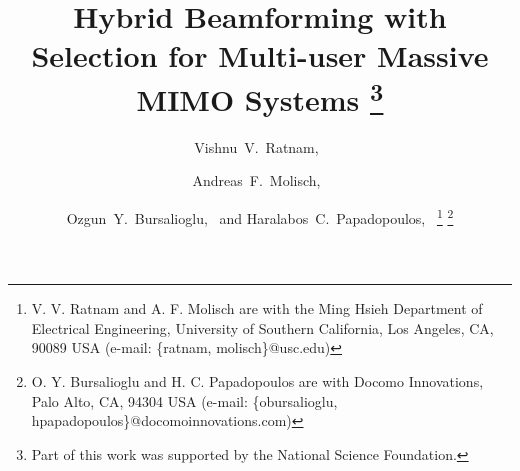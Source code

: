 \documentclass[journal,comsoc]{IEEEtran}
\begin{document}
%
\title{Hybrid Beamforming with Selection for Multi-user Massive MIMO Systems \thanks{Part of this work was supported by the National Science Foundation.}}

\author{Vishnu~V.~Ratnam,~
\and Andreas~F.~Molisch,~ %
\and Ozgun~Y.~Bursalioglu,~
and Haralabos~C.~Papadopoulos,~ %
\thanks{V. V. Ratnam and A. F. Molisch are with the Ming Hsieh Department of Electrical Engineering, University of Southern California, Los Angeles, CA, 90089 USA (e-mail: \{ratnam, molisch\}@usc.edu)}
\thanks{O. Y. Bursalioglu and H. C. Papadopoulos are with Docomo Innovations, Palo Alto, CA, 94304 USA (e-mail: \{obursalioglu, hpapadopoulos\}@docomoinnovations.com)}
}




% 
\end{document}
